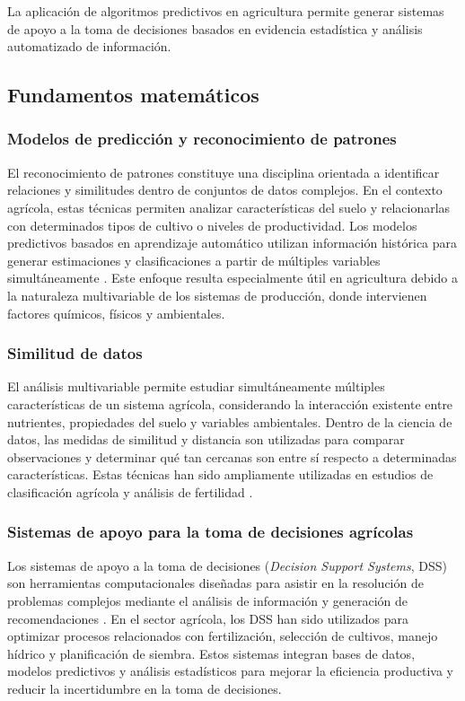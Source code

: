 \documentclass[12pt]{article}
\begin{document}
La aplicación de algoritmos predictivos en agricultura permite generar sistemas de apoyo a la toma de decisiones basados en evidencia estadística y análisis automatizado de información.

\subsection{Fundamentos matemáticos}

\subsubsection{Modelos de predicción y reconocimiento de patrones}
El reconocimiento de patrones constituye una disciplina orientada a identificar relaciones y similitudes dentro de conjuntos de datos complejos. En el contexto agrícola, estas técnicas permiten analizar características del suelo y relacionarlas con determinados tipos de cultivo o niveles de productividad. Los modelos predictivos basados en aprendizaje automático utilizan información histórica para generar estimaciones y clasificaciones a partir de múltiples variables simultáneamente \citep{mucherino_2009}. Este enfoque resulta especialmente útil en agricultura debido a la naturaleza multivariable de los sistemas de producción, donde intervienen factores químicos, físicos y ambientales.

\subsubsection{Similitud de datos}
El análisis multivariable permite estudiar simultáneamente múltiples características de un sistema agrícola, considerando la interacción existente entre nutrientes, propiedades del suelo y variables ambientales. Dentro de la ciencia de datos, las medidas de similitud y distancia son utilizadas para comparar observaciones y determinar qué tan cercanas son entre sí respecto a determinadas características. Estas técnicas han sido ampliamente utilizadas en estudios de clasificación agrícola y análisis de fertilidad \citep{sharma_2021}.

\subsubsection{Sistemas de apoyo para la toma de decisiones agrícolas}
Los sistemas de apoyo a la toma de decisiones (\textit{Decision Support Systems}, DSS) son herramientas computacionales diseñadas para asistir en la resolución de problemas complejos mediante el análisis de información y generación de recomendaciones \citep{mucherino_2009}. En el sector agrícola, los DSS han sido utilizados para optimizar procesos relacionados con fertilización, selección de cultivos, manejo hídrico y planificación de siembra. Estos sistemas integran bases de datos, modelos predictivos y análisis estadísticos para mejorar la eficiencia productiva y reducir la incertidumbre en la toma de decisiones.
\end{document}
